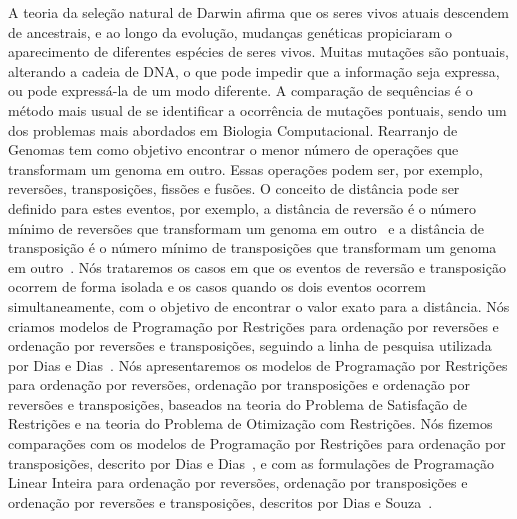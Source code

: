 A teoria da seleção natural de Darwin afirma que os seres vivos atuais
descendem de ancestrais, e ao longo da evolução, mudanças genéticas
propiciaram o aparecimento de diferentes espécies de seres vivos. Muitas
mutações são pontuais, alterando a cadeia de DNA, o que pode impedir que
a informação seja expressa, ou pode expressá-la de um modo diferente. A
comparação de sequências é o método mais usual de se identificar a
ocorrência de mutações pontuais, sendo um dos problemas mais abordados
em Biologia Computacional. Rearranjo de Genomas tem como objetivo
encontrar o menor número de operações que transformam um genoma em
outro. Essas operações podem ser, por exemplo, reversões, transposições,
fissões e fusões. O conceito de distância pode ser definido para estes
eventos, por exemplo, a distância de reversão é o número mínimo de
reversões que transformam um genoma em outro~\cite{BafnaPevzner*1996} e
a distância de transposição é o número mínimo de transposições que
transformam um genoma em outro~\cite{BafnaPevzner*1998}. Nós trataremos
os casos em que os eventos de reversão e transposição ocorrem de forma
isolada e os casos quando os dois eventos ocorrem simultaneamente, com o
objetivo de encontrar o valor exato para a distância. Nós criamos
modelos de Programação por Restrições para ordenação por reversões e
ordenação por reversões e transposições, seguindo a linha de pesquisa
utilizada por Dias e Dias~\cite{DiasDias*2009}. Nós apresentaremos os
modelos de Programação por Restrições para ordenação por reversões,
ordenação por transposições e ordenação por reversões e transposições,
baseados na teoria do Problema de Satisfação de Restrições e na teoria
do Problema de Otimização com Restrições. Nós fizemos comparações com os
modelos de Programação por Restrições para ordenação por transposições,
descrito por Dias e Dias~\cite{DiasDias*2009}, e com as formulações de
Programação Linear Inteira para ordenação por reversões, ordenação por
transposições e ordenação por reversões e transposições, descritos por
Dias e Souza~\cite{DiasSouza*2007}.

